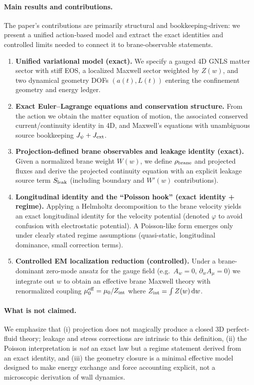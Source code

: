 \documentclass[11pt]{article}
\begin{document}
\paragraph{Main results and contributions.}
The paper's contributions are primarily structural and bookkeeping-driven: we present a unified action-based model and extract the exact identities and controlled limits needed to connect it to brane-observable statements.
\begin{enumerate}[leftmargin=2.2em]
\item \textbf{Unified variational model (exact).}
We specify a gauged 4D GNLS matter sector with stiff EOS, a localized Maxwell sector weighted by $Z(w)$, and two dynamical geometry DOFs $(a(t),L(t))$ entering the confinement geometry and energy ledger.
\item \textbf{Exact Euler--Lagrange equations and conservation structure.}
From the action we obtain the matter equation of motion, the associated conserved current/continuity identity in 4D, and Maxwell's equations with unambiguous source bookkeeping $J_\psi+J_{\rm ext}$.
\item \textbf{Projection-defined brane observables and leakage identity (exact).}
Given a normalized brane weight $W(w)$, we define $\rho_{\rm brane}$ and projected fluxes and derive the projected continuity equation with an explicit leakage source term $S_{\rm leak}$ (including boundary and $W'(w)$ contributions).
\item \textbf{Longitudinal identity and the ``Poisson hook'' (exact identity + regime).}
Applying a Helmholtz decomposition to the brane velocity yields an exact longitudinal identity for the velocity potential (denoted $\varphi$ to avoid confusion with electrostatic potential). A Poisson-like form emerges only under clearly stated regime assumptions (quasi-static, longitudinal dominance, small correction terms).
\item \textbf{Controlled EM localization reduction (controlled).}
Under a brane-dominant zero-mode ansatz for the gauge field (e.g.\ $A_w=0$, $\partial_w A_\mu=0$) we integrate out $w$ to obtain an effective brane Maxwell theory with renormalized coupling $\mu_0^{\rm eff}=\mu_0/Z_{\rm int}$ where $Z_{\rm int}=\int Z(w)\,\dd w$.
\end{enumerate}

\paragraph{What is not claimed.}
We emphasize that (i) projection does not magically produce a closed 3D perfect-fluid theory; leakage and stress corrections are intrinsic to this definition, (ii) the Poisson interpretation is \emph{not} an exact law but a regime statement derived from an exact identity, and (iii) the geometry closure is a minimal effective model designed to make energy exchange and force accounting explicit, not a microscopic derivation of wall dynamics.
\end{document}
